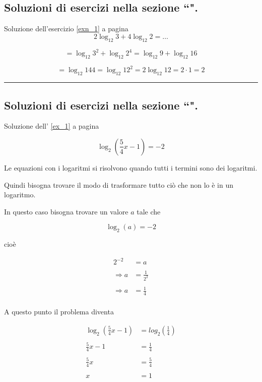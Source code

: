 \subsection{Soluzioni di esercizi nella sezione ``\textbf{}".}

Soluzione dell'esercizio \ref{exn_1} a pagina \pageref{exn_1}\label{soln_1}
\[
2\log_{12}3+4\log_{12}2=\ldots
\]

\[
=\log_{12}3^2+\log_{12}2^4=\log_{12}9+\log_{12}16
\]

\[
=\log_{12}144=\log_{12}12^2=2\log_{12}12=2\cdot 1=2
\]

\vspace{1cm}
\hrule
\vspace{1cm}

\subsection{Soluzioni di esercizi nella sezione ``\textbf{}".}

Soluzione dell' \ref{ex_1} a pagina \pageref{ex_1}\label{sol_1}

\[
\log_2\left(\frac{5}{4}x-1\right)=-2
\]

Le equazioni con i logaritmi si risolvono quando tutti i termini sono dei logaritmi.

Quindi bisogna trovare il modo di trasformare tutto ciò che non lo è in un logaritmo.

In questo caso bisogna trovare un valore $a$ tale che 

\[
\log_2(a)=-2
\]

cioè 

\[
\begin{split}
2^{-2}&=a \\
\\
\Rightarrow a&=\frac{1}{2^2} \\
\\
\Rightarrow a&=\frac{1}{4} \\
\end{split}
\]

A questo punto il problema diventa

\[
\begin{split}
\log_2\left(\frac{5}{4}x-1\right)&=log_2\left(\frac{1}{4}\right) \\
\\
\frac{5}{4}x-1&=\frac{1}{4} \\
\\
\frac{5}{4}x&=\frac{5}{4} \\
\\
x&=1
\end{split}
\]

